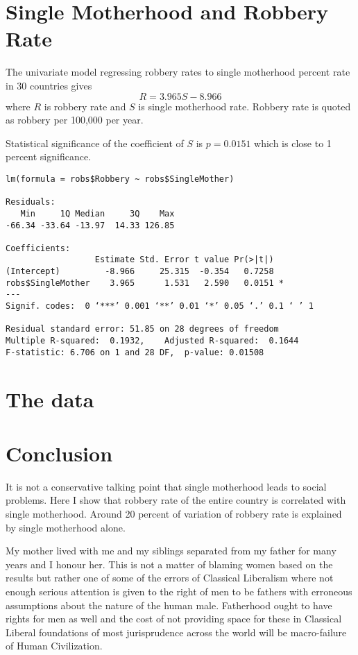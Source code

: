 \documentclass{amsart}
\begin{document}
\section{Single Motherhood and Robbery Rate}

The univariate model regressing robbery rates to single motherhood percent rate in 30 countries gives 
\[
R = 3.965 S - 8.966
\]
where $R$ is robbery rate and $S$ is single motherhood rate.  Robbery rate is quoted as robbery per 100,000 per year.

Statistical significance of the coefficient of $S$ is $p = 0.0151$ which is close to 1 percent significance.



\begin{verbatim}
lm(formula = robs$Robbery ~ robs$SingleMother)

Residuals:
   Min     1Q Median     3Q    Max 
-66.34 -33.64 -13.97  14.33 126.85 

Coefficients:
                  Estimate Std. Error t value Pr(>|t|)  
(Intercept)         -8.966     25.315  -0.354   0.7258  
robs$SingleMother    3.965      1.531   2.590   0.0151 *
---
Signif. codes:  0 ‘***’ 0.001 ‘**’ 0.01 ‘*’ 0.05 ‘.’ 0.1 ‘ ’ 1

Residual standard error: 51.85 on 28 degrees of freedom
Multiple R-squared:  0.1932,	Adjusted R-squared:  0.1644 
F-statistic: 6.706 on 1 and 28 DF,  p-value: 0.01508
\end{verbatim}

\section{The data}

\section{Conclusion}
It is not a conservative talking point that single motherhood leads to social problems.  Here I show that robbery rate of the entire country is correlated with single motherhood.  Around 20 percent of variation of robbery rate is explained by single motherhood alone.

My mother lived with me and my siblings separated from my father for many years and I honour her.  This is not a matter of blaming women based on the results but rather one of some of the errors of Classical Liberalism where not enough serious attention is given to the right of men to be fathers with erroneous assumptions about the nature of the human male.  Fatherhood ought to have rights for men as well and the cost of not providing space for these in Classical Liberal foundations of most jurisprudence across the world will be macro-failure of Human Civilization.  
\end{document}
